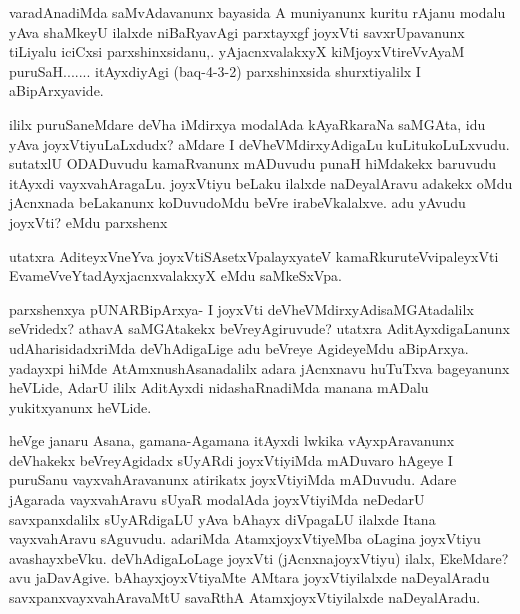 \begin{artha}
varadAnadiMda saMvAdavanunx bayasida A muniyanunx kuritu rAjanu modalu yAva shaMkeyU ilalxde niBaRyavAgi parxtayxgf joyxVti savxrUpavanunx tiLiyalu iciCxsi parxshinxsidanu,. yAjacnxvalakxyX kiMjoyxVtireVvAyaM puruSaH.......  itAyxdiyAgi (baq-4-3-2) parxshinxsida shurxtiyalilx I aBipArxyavide.
\end{artha}


\begin{artha}
ililx puruSaneMdare deVha iMdirxya modalAda kAyaRkaraNa saMGAta, idu yAva joyxVtiyuLaLxdudx? aMdare I deVheVMdirxyAdigaLu kuLitukoLuLxvudu. sutatxlU ODADuvudu kamaRvanunx mADuvudu punaH hiMdakekx baruvudu itAyxdi vayxvahAragaLu. joyxVtiyu beLaku ilalxde naDeyalAravu adakekx oMdu jAcnxnada beLakanunx koDuvudoMdu beVre irabeVkalalxve. adu yAvudu joyxVti? eMdu parxshenx 
\end{artha}

\begin{artha}%
utatxra AditeyxVneYva joyxVtiSAsetxVpalayxyateV kamaRkuruteV\break vipaleyxVti EvameVveYtadAyxjacnxvalakxyX eMdu saMkeSxVpa. 

parxshenxya pUNARBipArxya- I joyxVti deVheVMdirxyAdi\break saMGAtadalilx seVridedx? athavA saMGAtakekx beVreyAgiruvude? utatxra AditAyxdigaLanunx udAharisidadxriMda deVhAdigaLige adu beVreye AgideyeMdu aBipArxya. yadayxpi hiMde AtAmxnushAsanadalilx adara jAcnxnavu huTuTxva bageyanunx heVLide, AdarU ililx AditAyxdi nidashaRnadiMda manana mADalu yukitxyanunx heVLide. 
\end{artha}

\begin{artha}
heVge janaru Asana, gamana-Agamana itAyxdi lwkika vAyxpAravanunx deVhakekx beVreyAgidadx sUyARdi joyxVtiyiMda mADuvaro hAgeye I puruSanu vayxvahAravanunx atirikatx joyxVtiyiMda mADuvudu. Adare jAgarada vayxvahAravu sUyaR modalAda joyxVtiyiMda neDedarU savxpanxdalilx sUyARdigaLU yAva bAhayx diVpagaLU ilalxde Itana vayxvahAravu sAguvudu. adariMda AtamxjoyxVtiyeMba oLagina joyxVtiyu avashayxbeVku. deVhAdigaLoLage joyxVti (jAcnxnajoyxVtiyu) ilalx, EkeMdare? avu jaDavAgive. bAhayxjoyxVtiyaMte AMtara joyxVtiyilalxde naDeyalAradu savxpanxvayxvahAravaMtU savaRthA AtamxjoyxVtiyilalxde naDeyalAradu.  
\end{artha}

